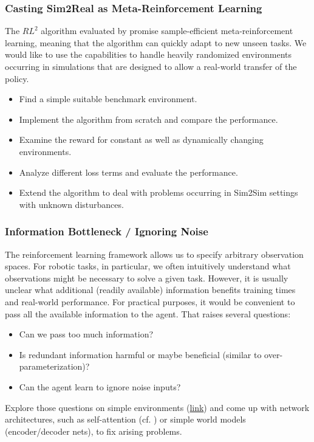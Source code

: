 \documentclass[a4paper]{article}
\begin{document}
\subsubsection{Casting Sim2Real as Meta-Reinforcement Learning}
The $RL^2$ algorithm evaluated by \citet{Yu2019} promise sample-efficient meta-reinforcement learning, meaning that the algorithm can quickly adapt to new unseen tasks. We would like to use the capabilities to handle heavily randomized environments occurring in simulations that are designed to allow a real-world transfer of the policy.
\begin{itemize}
  \item Find a simple suitable benchmark environment.
  \item Implement the algorithm from scratch and compare the performance.
  \item Examine the reward for constant as well as dynamically changing environments.
  \item Analyze different loss terms and evaluate the performance.
  \item Extend the algorithm to deal with problems occurring in Sim2Sim settings with unknown disturbances.
\end{itemize}



\subsubsection{Information Bottleneck / Ignoring Noise}
The reinforcement learning framework allows us to specify arbitrary observation spaces.
For robotic tasks, in particular, we often intuitively understand what observations might be necessary to solve a given task.
However, it is usually unclear what additional (readily available) information benefits training times and real-world performance.
For practical purposes, it would be convenient to pass all the available information to the agent.
That raises several questions:
\begin{itemize}
  \item Can we pass too much information?
  \item Is redundant information harmful or maybe beneficial (similar to over-parameterization)?
  \item Can the agent learn to ignore noise inputs?
\end{itemize}
Explore those questions on simple environments (\href{https://gymnasium.farama.org/environments/mujoco/}{link}) and come up with network architectures, such as self-attention (cf. \citet{Tang2020}) or simple world models (encoder/decoder nets), to fix arising problems.
\end{document}

